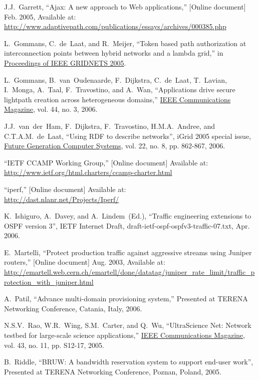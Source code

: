 \documentclass[conference]{IEEEtran}
\begin{document}
\begin{thebibliography}{1}
J.J.~Garrett,
``Ajax: A new approach to Web applications,'' [Online document] Feb. 2005,
Available at: \url{http://www.adaptivepath.com/publications/essays/archives/000385.php}

L.~Gommans, C.~de~Laat, and R.~Meijer,
``Token based path authorization at interconnection points between hybrid
networks and a lambda grid,''
in \underline{Proceedings of IEEE GRIDNETS 2005}.

L.~Gommans, B.~van~Oudenaarde, F.~Dijkstra, C.~de~Laat, T.~Lavian, I.~Monga,
A.~Taal, F.~Travostino, and A.~Wan,
``Applications drive secure lightpath creation across heterogeneous domains,''
\underline{IEEE Communications Magazine},
vol. 44, no. 3, 2006.

J.J.~van~der~Ham, F.~Dijkstra, F.~Travostino, H.M.A.~Andree, and C.T.A.M.~de~Laat,
``Using RDF to describe networks'',
iGrid 2005 special issue,
\underline{Future Generation Computer Systems},
vol. 22, no. 8, pp. 862-867, 2006.

``IETF CCAMP Working Group,'' [Online document] Available at:
\url{http://www.ietf.org/html.charters/ccamp-charter.html}

``iperf,'' [Online document] Available at: \\
\url{http://dast.nlanr.net/Projects/Iperf/}

K.~Ishiguro, A.~Davey, and A.~Lindem~(Ed.),
``Traffic engineering extensions to OSPF version 3'',
IETF Internet Draft,
draft-ietf-ospf-ospfv3-traffic-07.txt, Apr. 2006.

E.~Martelli,
``Protect production traffic against aggressive streams using Juniper routers,''
[Online document] Aug. 2003, Available at:
\url{http://emartell.web.cern.ch/emartell/done/datatag/juniper_rate_limit/traffic_protection_with_juniper.html}

A.~Patil,
``Advance multi-domain provisioning system,''
Presented at TERENA Networking Conference, Catania, Italy, 2006.

N.S.V.~Rao, W.R.~Wing, S.M.~Carter, and Q.~Wu,
``UltraScience Net: Network testbed for large-scale science applications,''
\underline{IEEE Communications Magazine}, vol. 43, no. 11, pp. S12-17, 2005.

B.~Riddle,
``BRUW: A bandwidth reservation system to support end-user work'',
Presented at TERENA Networking Conference, Poznan, Poland, 2005.


\end{thebibliography}
\end{document}
